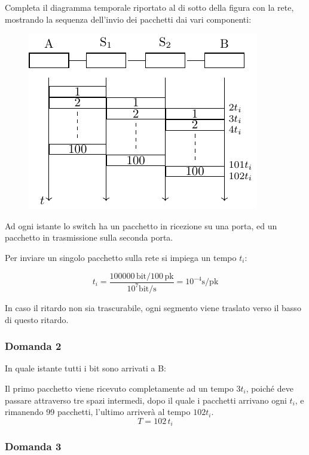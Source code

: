 \documentclass{article}
\numberwithin{equation}{subsection}
\begin{document}
Completa il diagramma temporale riportato al di sotto della figura con la rete, mostrando la sequenza dell'invio dei pacchetti dai vari componenti:

\begin{figure}[H]%
    \centering%
    \includegraphics{effetto_store_forward_domanda_1.pdf}%
\end{figure}

Ad ogni istante lo switch ha un pacchetto in ricezione su una porta, ed un pacchetto in trasmissione sulla seconda porta. 

Per inviare un singolo pacchetto sulla rete si impiega un tempo $t_i$:

\begin{equation}
    t_i=\displaystyle\frac{100000\,\mathrm{bit}/100\,\mathrm{pk}}{10^7 \mathrm{bit/s}}=10^{-4}\mathrm{s/pk}
\end{equation}

In caso il ritardo non sia trascurabile, ogni segmento viene traslato verso il basso di questo ritardo. 

\subsubsection*{Domanda 2}

In quale istante tutti i bit sono arrivati a B:


Il primo pacchetto viene ricevuto completamente ad un tempo $3t_i$, poiché deve passare attraverso tre spazi intermedi, dopo il quale i pacchetti 
arrivano ogni $t_i$, e rimanendo 99 pacchetti, l'ultimo arriverà al tempo $102t_i$. 
\begin{equation}
    T=102\,t_i
\end{equation}


\subsubsection*{Domanda 3}
\end{document}
